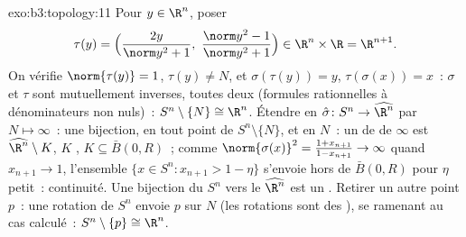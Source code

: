 \begin{solution}{exo:b3:topology:11}
Pour $y \in \R^n$, poser
\[
\tau(y) = \Bigl(\frac{2y}{\norm y^2 + 1},\ \frac{\norm y^2 -
1}{\norm y^2 + 1}\Bigr) \in \R^n\times\R = \R^{n+1}.
\]
On vérifie $\norm{\tau(y)} = 1$, $\tau(y) \neq N$, et
$\sigma(\tau(y)) = y$, $\tau(\sigma(x)) = x$~: $\sigma$ et
$\tau$ sont mutuellement inverses, toutes deux 
(formules rationnelles à dénominateurs non nuls)~: $S^n
\setminus\{N\} \cong \R^n$. Étendre en $\hat\sigma \colon S^n
\to \widehat{\R^n}$ par $N \mapsto \infty$~: une bijection,
 en tout point de $S^n\setminus\{N\}$, et en $N$~: un
 de  de $\infty$ est $\widehat{\R^n}\setminus
K$, $K$ , $K \subseteq \bar B(0, R)$~; comme
$\norm{\sigma(x)}^2 = \frac{1 + x_{n+1}}{1 - x_{n+1}} \to
\infty$ quand $x_{n+1} \to 1$, l'ensemble $\{x \in S^n :
x_{n+1} > 1 - \eta\}$ s'envoie hors de $\bar B(0,R)$ pour
$\eta$ petit~: continuité. Une bijection  du 
$S^n$ vers le  $\widehat{\R^n}$ est un .
Retirer un autre point $p$~: une rotation de $S^n$ envoie $p$
sur $N$ (les rotations sont des ), se ramenant
au cas calculé~: $S^n \setminus \{p\} \cong \R^n$.
\end{solution}


